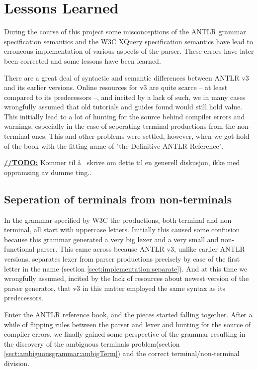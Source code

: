 \section{Lessons Learned}
\label{sect:discussion:deadEnds}
During the course of this project some misconceptions of the ANTLR grammar specification semantics and the W3C XQuery specification semantics have lead to erroneous implementation of various aspects of the parser. These errors have later been corrected and some lessons have been learned.

There are a great deal of syntactic and semantic differences between ANTLR v3 and its earlier versions. Online resources for v3 are quite scarce -- at least compared to its predecessors --, and incited by a lack of such, we in many cases wrongfully assumed that old tutorials and guides found would still hold value. This initially lead to a lot of hunting for the source behind compiler errors and warnings, especially in the case of seperating terminal productions from the non-terminal ones. This and other problems were settled, however, when we got hold of the book with the fitting name of "the Definitive ANTLR Reference"\cite{definitiveAntlr}.



\underline{\textbf{\LARGE //TODO:}} Kommer til \aa~ skrive om dette til en generell diskusjon, ikke med oppramsing av dumme ting..



\subsection{Seperation of terminals from non-terminals }

In the grammar specified by W3C the productions, both terminal and non-terminal, all start with uppercase letters. Initially this caused some confusion because this grammar generated a very big lexer and a very small and non-functional parser. This came across because ANTLR v3, unlike earlier ANTLR versions, separates lexer from parser productions precisely by case of the first letter in the name (section \ref{sect:implementation:separate}). And at this time we wrongfully assumed, incited by the lack of resources about newest version of the parser generator, that v3 in this matter employed the same syntax as its predecessors.

Enter the ANTLR reference book\cite{definitiveAntlr}, and the pieces started falling together. After a while of flipping rules between the parser and lexer and hunting for the source of compiler errors, we finally gained some perspective of the grammar resulting in the discovery of the ambiguous terminals problem(section \ref{sect:ambiguousgrammar:ambigTerm}) and the correct terminal/non-terminal division.

